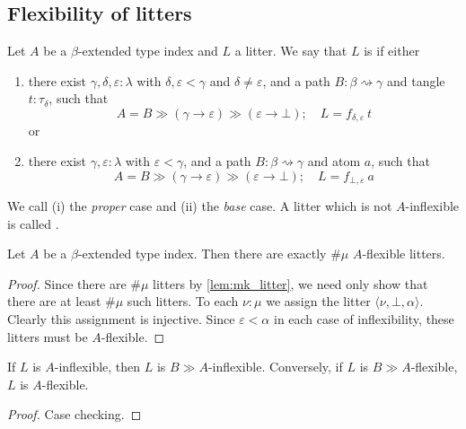 \subsection{Flexibility of litters}

\begin{definition}
    Let \( A \) be a \( \beta \)-extended type index and \( L \) a litter.
    We say that \( L \) is  if either
    \begin{enumerate}
        \item there exist \( \gamma, \delta, \varepsilon : \lambda \) with \( \delta, \varepsilon < \gamma \) and \( \delta \neq \varepsilon \), and a path \( B : \beta \rightsquigarrow \gamma \) and tangle \( t : \tau_\delta \), such that
        \[ A = B \gg (\gamma \to \varepsilon) \gg (\varepsilon \to \bot);\quad L = f_{\delta,\varepsilon}\ t \]
        or
        \item there exist \( \gamma, \varepsilon : \lambda \) with \( \varepsilon < \gamma \), and a path \( B : \beta \rightsquigarrow \gamma \) and atom \( a \), such that
        \[ A = B \gg (\gamma \to \varepsilon) \gg (\varepsilon \to \bot);\quad L = f_{\bot,\varepsilon}\ a \]
    \end{enumerate}
    We call (i) the \emph{proper} case and (ii) the \emph{base} case.
    A litter which is not \( A \)-inflexible is called .
\end{definition}
\begin{lemma}
    \label{lem:mk_flexible}
    Let \( A \) be a \( \beta \)-extended type index.
    Then there are exactly \( \#\mu \) \( A \)-flexible litters.
\end{lemma}
\begin{proof}
    Since there are \( \#\mu \) litters by \cref{lem:mk_litter}, we need only show that there are at least \( \#\mu \) such litters.
    To each \( \nu : \mu \) we assign the litter \( \langle \nu, \bot, \alpha \rangle \).
    Clearly this assignment is injective.
    Since \( \varepsilon < \alpha \) in each case of inflexibility, these litters must be \( A \)-flexible.
\end{proof}
\begin{lemma}
    \label{lem:comp_flexible}
    If \( L \) is \( A \)-inflexible, then \( L \) is \( B \gg A \)-inflexible.
    Conversely, if \( L \) is \( B \gg A \)-flexible, \( L \) is \( A \)-flexible.
\end{lemma}
\begin{proof}
    Case checking.
\end{proof}
